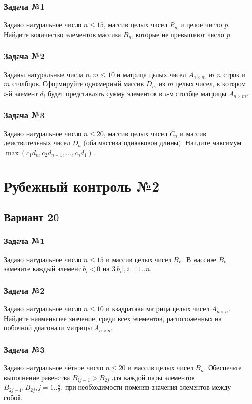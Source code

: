 \documentclass[12pt,a5paper,landscape]{report}
\begin{document}
\subsubsection*{Задача №1}
Задано натуральное число $n \le 15$, массив целых чисел $B_n$ и целое число $p$. Найдите количество элементов массива $B_n$, которые не превышают число $p$.
\subsubsection*{Задача №2}
Заданы натуральные числа $n, m \le 10$ и матрица целых чисел $A_{n \times m}$ из $n$ строк и $m$ столбцов. Сформируйте одномерный массив $D_m$ из $m$ целых чисел, в котором $i$-й элемент $d_i$ будет представлять сумму элементов в $i$-м столбце матрицы $A_{n \times m}$.
\subsubsection*{Задача №3}
Задано натуральное число $n \le 20$, массив целых чисел $C_n$ и массив действительных чисел $D_n$ (оба массива одинаковой длины). Найдите максимум $\max({ c_1 d_n, c_2 d_{n-1}, \ldots, c_n d_1 })$.


\clearpage
\section*{Рубежный контроль №2}
\subsection*{Вариант 20}
\subsubsection*{Задача №1}
Задано натуральное число $n \le 15$ и массив целых чисел $B_n$. В массиве $B_n$ замените каждый элемент $b_i < 0$ на $3|b_i|, i = 1..n$.
\subsubsection*{Задача №2}
Задано натуральное число $n \le 10$ и квадратная матрица целых чисел $A_{n \times n}$. Найдите наименьшее значение, среди всех элементов, расположенных на побочной диагонали матрицы $A_{n \times n}$.
\subsubsection*{Задача №3}
Задано натуральное чётное число $n \le 20$ и массив целых чисел $B_n$. Обеспечьте выполнение равенства $B_{2j-1} > B_{2j}$ для каждой пары элементов $B_{2j-1}, B_{2j}, j=1..\frac{n}{2}$, при необходимости поменяв значения элементов между собой.
\end{document}
